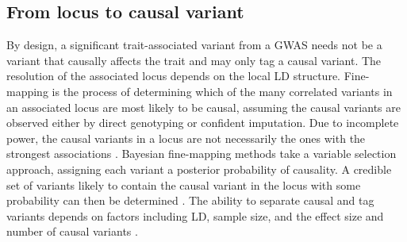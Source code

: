 %
%
%
%
%

\subsection{From locus to causal variant}

By design, a significant trait-associated variant from a \gls{GWAS} needs not be a variant that causally affects the trait and may only tag a causal variant.
The resolution of the associated locus depends on the local \gls{LD} structure.
Fine-mapping is the process of determining which of the many correlated variants in an associated locus are most likely to be causal,
assuming the causal variants are observed either by direct genotyping or confident imputation.
Due to incomplete power, the causal variants in a locus are not necessarily the ones with the strongest associations \autocite{schaid2018GenomewideAssociationsCandidate}.
Bayesian fine-mapping methods take a variable selection approach, 
assigning each variant a posterior probability of causality.
A credible set of variants likely to contain the causal variant in the locus with some probability can then be determined \autocite{schaid2018GenomewideAssociationsCandidate,wang2020SimpleNewApproach}.
The ability to separate causal and tag variants depends on factors including \gls{LD}, sample size, and the effect size and number of causal variants \autocite{visscher201710YearsGWAS,schaid2018GenomewideAssociationsCandidate}.

